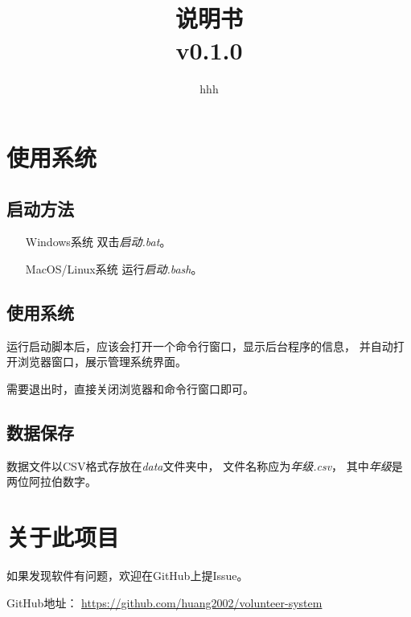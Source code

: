 \documentclass[12pt,titlepage]{article}
\title{\systemname\\说明书\\v0.1.0}
\author{hhh}
\begin{document}
\maketitle

\tableofcontents
\thispagestyle{empty}
\setcounter{page}{0}

\pagestyle{headings}

\newpage
\section{使用系统}

\subsection{启动方法}

\begin{itemize}
    \item[Windows系统] 双击\textit{启动.bat}。
    \item[MacOS/Linux系统] 运行\textit{启动.bash}。
\end{itemize}

\subsection{使用系统}

运行启动脚本后，应该会打开一个命令行窗口，显示后台程序的信息，
并自动打开浏览器窗口，展示管理系统界面。

需要退出时，直接关闭浏览器和命令行窗口即可。

\subsection{数据保存}

数据文件以CSV格式存放在\textit{data}文件夹中，
文件名称应为\textit{年级.csv}，
其中\textit{年级}是两位阿拉伯数字。

\newpage
\section{关于此项目}

如果发现软件有问题，欢迎在GitHub上提Issue。

GitHub地址：
\url{https://github.com/huang2002/volunteer-system}
\end{document}
